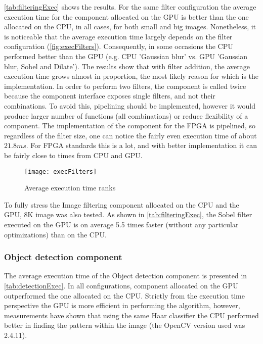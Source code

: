 \documentclass{sig-alternate}
\begin{document}
\autoref{tab:filteringExec} shows the results.  For the same filter configuration the average execution time for the component allocated on the GPU is better than the one allocated on the CPU, in all cases, for both small and big images. Nonetheless, it is noticeable that the average execution time largely depends on the filter configuration (\autoref{fig:execFilters}). Consequently, in some occasions the CPU performed better than the GPU (e.g. CPU 'Gaussian blur' vs. GPU 'Gaussian blur, Sobel and Dilate'). The results show that with filter addition, the average execution time grows almost in proportion, the most likely reason for which is the implementation. In order to perform two filters, the component is called twice because the component interface exposes single filters, and not their combinations. To avoid this, pipelining should be implemented, however it would produce larger number of functions (all combinations) or reduce flexibility of a component. The implementation of the component for the FPGA is pipelined, so regardless of the filter size, one can notice the fairly even execution time of about $21.8ms$. For FPGA standards this is a lot, and with better implementation it can be fairly close to times from CPU and GPU. 

\begin{figure}[h!]
    \centering
		\texttt{[image: execFilters]}
    \caption{Average execution time ranks}
    \label{fig:execFilters}
\end{figure}

To fully stress the Image filtering component allocated on the CPU and the GPU, 8K image was also tested. As shown in \autoref{tab:filteringExec}, the Sobel filter executed on the GPU is on average 5.5 times faster (without any particular optimizations) than on the CPU. 

\subsubsection*{Object detection component}

The average execution time of the Object detection component is presented in \autoref{tab:detectionExec}. In all configurations, component allocated on the GPU outperformed the one allocated on the CPU. Strictly from the execution time perspective the GPU is more efficient in performing the algorithm, however, measurements have shown that using the same Haar classifier the CPU performed better in finding the pattern within the image (the OpenCV version used was 2.4.11).  
\end{document}
